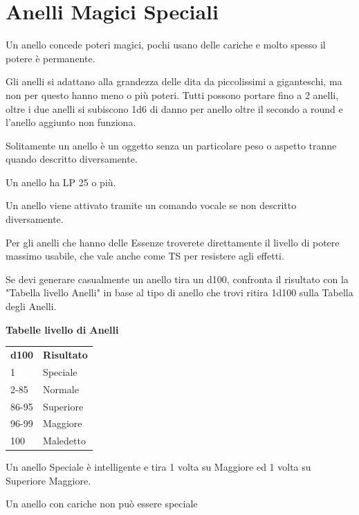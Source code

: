 \documentclass[a4paper,11pt,twoside,openany]{book}
\begin{document}
\pagebreak

\section{Anelli Magici Speciali}

\label{anelli-magici-speciali}

Un anello concede poteri magici, pochi usano delle cariche e molto spesso il potere è permanente.

Gli anelli si adattano alla grandezza delle dita da piccolissimi a giganteschi, ma non per questo hanno meno o più poteri. Tutti possono portare fino a 2 anelli, oltre i due anelli si subiscono 1d6 di danno per anello oltre il secondo a round e l'anello aggiunto non funziona.

Solitamente un anello è un oggetto senza un particolare peso o aspetto tranne quando descritto diversamente.

Un anello ha LP 25 o più.

Un anello viene attivato tramite un comando vocale se non descritto diversamente.

Per gli anelli che hanno delle Essenze troverete direttamente il livello di potere massimo usabile, che vale anche come TS per resistere agli effetti.

Se devi generare casualmente un anello tira un d100, confronta il risultato con la "Tabella livello Anelli" in base al tipo di anello che trovi ritira 1d100 sulla Tabella degli Anelli.

\bigskip

\textbf{Tabelle livello di Anelli}

\medskip
\begin{tabular}{ll}
	\toprule
	\textbf{d100} & \textbf{Risultato}\\
	1             & Speciale\\
	2-85          & Normale\\
	86-95         & Superiore\\
	96-99         & Maggiore\\
	100           & Maledetto\\
\end{tabular}

\bigskip

Un anello Speciale è intelligente e tira 1 volta su Maggiore ed 1 volta su Superiore Maggiore.

Un anello con cariche non può essere speciale

\pagebreak
\end{document}
